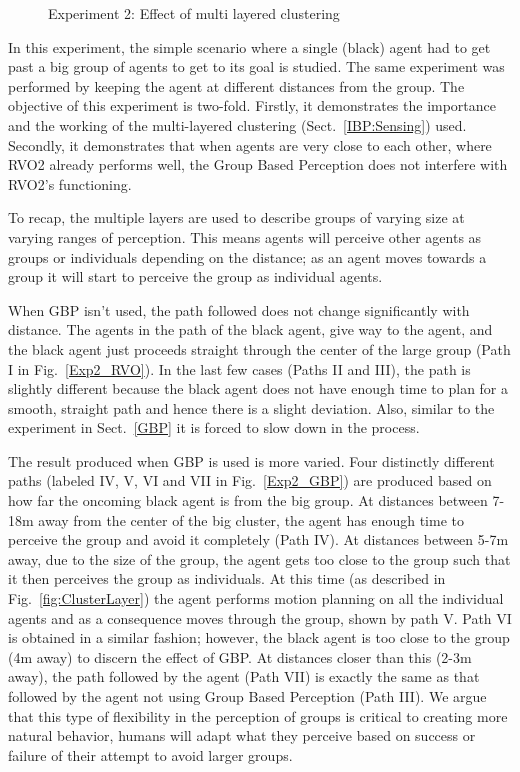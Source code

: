 \begin{figure}[!t]
  \centering
   \hspace{1pt}
  \caption{Experiment 2: Effect of multi layered clustering}
  \label{Exp2}
\end{figure}

In this experiment, the simple scenario where a single (black) agent had to get past a big group of agents to get to its goal is studied. The same experiment was performed by keeping the agent at different distances from the group. The objective of this experiment is two-fold. Firstly, it demonstrates the importance and the working of the multi-layered clustering (Sect.~\ref{IBP:Sensing}) used. Secondly, it demonstrates that when agents are very close to each other, where RVO2 already performs well, the Group Based Perception does not interfere with RVO2's functioning.

To recap, the multiple layers are used to describe groups of varying size at varying ranges of perception. This means agents will perceive other agents as groups or individuals depending on the distance; as an agent moves towards a group it will start to perceive the group as individual agents.

When GBP isn't used, the path followed does not change significantly with distance. The agents in the path of the black agent, give way to the agent, and the black agent just proceeds straight through the center of the large group (Path I in Fig.~\ref{Exp2_RVO}). In the last few cases (Paths II and III), the path is slightly different because the black agent does not have enough time to plan for a smooth, straight path and hence there is a slight deviation. Also, similar to the experiment in Sect.~\ref{GBP} it is forced to slow down in the process.

The result produced when GBP is used is more varied. Four distinctly different paths (labeled IV, V, VI and VII in Fig.~\ref{Exp2_GBP}) are produced based on how far the oncoming black agent is from the big group. At distances between 7-18m away from the center of the big cluster, the agent has enough time to perceive the group and avoid it completely (Path IV). At distances between 5-7m away, due to the size of the group, the agent gets too close to the group such that it then perceives the group as individuals. At this time (as described in Fig.~\ref{fig:ClusterLayer}) the agent performs motion planning on all the individual agents and as a consequence moves through the group, shown by path V. Path VI is obtained in a similar fashion; however, the black agent is too close to the group (4m away) to discern the effect of GBP. At distances closer than this (2-3m away), the path followed by the agent (Path VII) is exactly the same as that followed by the agent not using Group Based Perception (Path III). We argue that this type of flexibility in the perception of groups is critical to creating more natural behavior, humans will adapt what they perceive based on success or failure of their attempt to avoid larger groups.

